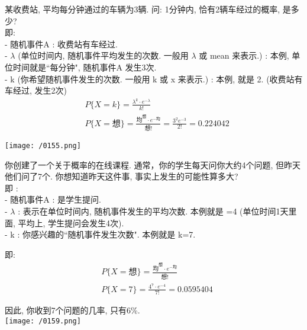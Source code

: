 \documentclass[UTF8]{ctexart}
\begin{document}
	\vspace{1em} 
	
	
	
	
	\begin{myEnvSample}
		某收费站, 平均每分钟通过的车辆为3辆. 问: 1分钟内, 恰有2辆车经过的概率, 是多少? \\
		即: \\
		- 随机事件A : 收费站有车经过. \\
		- $\lambda$ (单位时间内, 随机事件平均发生的次数. 一般用 $\lambda$ 或 mean 来表示.) : 本例, 单位时间就是``每分钟", 随机事件A 发生3次. \\
		- k (你希望随机事件发生的次数. 一般用 k 或 x 来表示.) : 本例, 就是 2. (收费站有车经过, 发生2次) 
\begin{align*}  %
	&P\{X=k\}=\frac{\lambda ^k\cdot e^{-\lambda}}{k!}\\
&P\{X=\text{想\}}=\frac{\text{均}^{\text{想}}\cdot e^{-\text{均}}}{\text{想!}}=\frac{3^2e^{-3}}{2!}=0.224042
\end{align*}

	\texttt{[image: /0155.png]} 	
	\end{myEnvSample}
	\vspace{1em} 
	
	
	
	
	\begin{myEnvSample}
		你创建了一个关于概率的在线课程. 通常，你的学生每天问你大约4个问题, 但昨天他们问了7个. 你想知道昨天这件事, 事实上发生的可能性算多大? \\
		即 : \\
		- 随机事件A : 是学生提问. \\
		- $\lambda$ : 表示在单位时间内, 随机事件发生的平均次数. 本例就是 =4 (单位时间1天里面, 平均上, 学生提问会发生4次). \\
		- k : 你感兴趣的``随机事件发生次数". 本例就是 k=7. 
		
		即: 
		\begin{align*}  %
	&P\{X=\text{想\}}=\frac{\text{均}^{\text{想}}\cdot e^{-\text{均}}}{\text{想!}}\\
&P\{X=7\}=\frac{4^7\cdot e^{-4}}{7!}=0.0595404
		\end{align*}
	
	因此, 你收到7个问题的几率, 只有6\%. \\
	
	\texttt{[image: /0159.png]} 
	\end{myEnvSample}
	\vspace{1em} 
	
\end{document}
